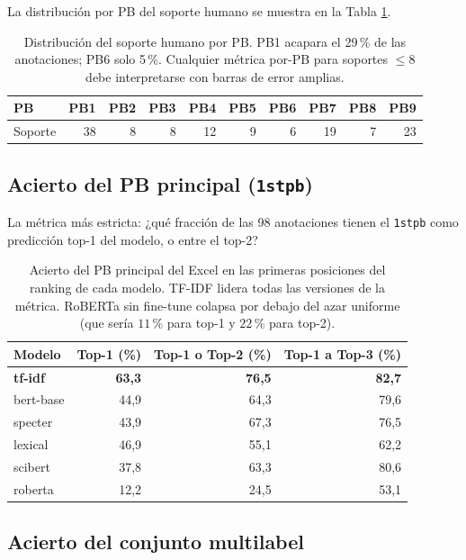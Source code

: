 \documentclass[11pt,a4paper]{article}
\newcommand{\good}[1]{\textbf{\textcolor{accent}{#1}}}
\begin{document}
La distribución por PB del soporte humano se muestra en la Tabla \ref{tab:soporte}.

\begin{table}[h]
\centering
\small
\begin{tabular}{lrrrrrrrrr}
\toprule
PB & PB1 & PB2 & PB3 & PB4 & PB5 & PB6 & PB7 & PB8 & PB9 \\
\midrule
Soporte & 38 & 8 & 8 & 12 & 9 & 6 & 19 & 7 & 23 \\
\bottomrule
\end{tabular}
\caption{Distribución del soporte humano por PB. PB1 acapara el 29\,\% de las anotaciones; PB6 solo 5\,\%. Cualquier métrica por-PB para soportes $\leq 8$ debe interpretarse con barras de error amplias.}
\label{tab:soporte}
\end{table}

\subsection{Acierto del PB principal (\texttt{1stpb})}

La métrica más estricta: ¿qué fracción de las 98 anotaciones tienen el \texttt{1stpb} como predicción top-1 del modelo, o entre el top-2?

\begin{table}[h]
\centering
\small
\begin{tabular}{lrrr}
\toprule
\textbf{Modelo} & \textbf{Top-1 (\%)} & \textbf{Top-1 o Top-2 (\%)} & \textbf{Top-1 a Top-3 (\%)} \\
\midrule
\good{tf-idf} & \good{63{,}3} & \good{76{,}5} & \good{82{,}7} \\
bert-base & 44{,}9 & 64{,}3 & 79{,}6 \\
specter & 43{,}9 & 67{,}3 & 76{,}5 \\
lexical & 46{,}9 & 55{,}1 & 62{,}2 \\
scibert & 37{,}8 & 63{,}3 & 80{,}6 \\
roberta & 12{,}2 & 24{,}5 & 53{,}1 \\
\bottomrule
\end{tabular}
\caption{Acierto del PB principal del Excel en las primeras posiciones del ranking de cada modelo. TF-IDF lidera todas las versiones de la métrica. RoBERTa sin fine-tune colapsa por debajo del azar uniforme (que sería $11\,\%$ para top-1 y $22\,\%$ para top-2).}
\label{tab:primary}
\end{table}

\subsection{Acierto del conjunto multilabel}
\end{document}
